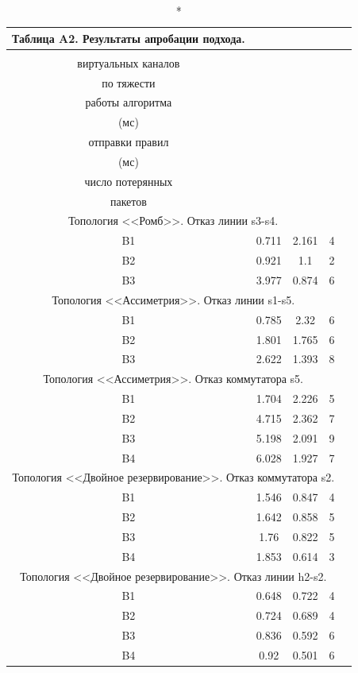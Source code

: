 \documentclass[12pt, a4paper]{article}
\begin{document}
\begin{longtable}[h]{|c|c|c|c|c|}
	\caption*{Таблица A2. Результаты апробации подхода.}
	 \\
	\hline
	\begin{tabular}[c]{@{}c@{}}Распределение\\ виртуальных каналов\\ по тяжести\end{tabular} & \begin{tabular}[c]{@{}c@{}}Время\\ работы алгоритма\\ (мс)\end{tabular} & \begin{tabular}[c]{@{}c@{}}Время генерации и \\ отправки правил \\ (мс)\end{tabular} & \begin{tabular}[c]{@{}c@{}}Максимальное\\ число потерянных\\ пакетов\end{tabular} \\ \hline
	\endfirsthead
	\endhead
	\multicolumn{4}{|c|}{Топология <<Ромб>>. Отказ линии s3-s4.} \\ \hline
	B1 & 0.711 & 2.161 & 4 \\ \hline
	B2 & 0.921 & 1.1 & 2 \\ \hline
	B3 & 3.977 & 0.874 & 6 \\ \hline
	\multicolumn{4}{|c|}{Топология <<Ассиметрия>>. Отказ линии s1-s5.} \\ \hline
	B1 & 0.785 & 2.32 & 6 \\ \hline
	B2 & 1.801 & 1.765 & 6 \\ \hline
	B3 & 2.622 & 1.393 & 8 \\ \hline
	\multicolumn{4}{|c|}{Топология <<Ассиметрия>>. Отказ коммутатора s5.} \\ \hline
	B1 & 1.704 & 2.226 & 5\\ \hline
	B2 & 4.715 & 2.362 & 7\\ \hline
	B3 & 5.198 & 2.091 & 9\\ \hline
	B4 & 6.028 & 1.927& 7\\ \hline
	\multicolumn{4}{|c|}{Топология <<Двойное резервирование>>. Отказ коммутатора s2.} \\ \hline
	B1 & 1.546 & 0.847 & 4 \\ \hline
	B2 & 1.642 & 0.858 & 5 \\ \hline
	B3 & 1.76 & 0.822 & 5 \\ \hline
	B4 & 1.853 & 0.614 & 3 \\ \hline
	\multicolumn{4}{|c|}{Топология <<Двойное резервирование>>. Отказ линии h2-s2.} \\ \hline
	B1 & 0.648 & 0.722 & 4 \\ \hline
	B2 & 0.724 & 0.689 & 4 \\ \hline
	B3 & 0.836 & 0.592 & 6 \\ \hline
	B4 & 0.92 & 0.501 & 6 \\ \hline
\end{longtable}
\end{document}
